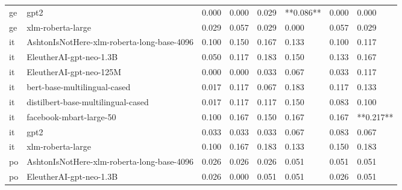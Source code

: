 \begin{tabular}{llllllll}
      ge &                                       gpt2 & 0.000 &                     0.000 &                 0.029 &              **0.086** &                                   0.000 &     0.000 \\
      ge &                          xlm-roberta-large & 0.029 &                     0.057 &                 0.029 &                  0.000 &                                   0.057 &     0.029 \\
      it & AshtonIsNotHere-xlm-roberta-long-base-4096 & 0.100 &                     0.150 &                 0.167 &                  0.133 &                                   0.100 &     0.117 \\
      it &                    EleutherAI-gpt-neo-1.3B & 0.050 &                     0.117 &                 0.183 &                  0.150 &                                   0.133 &     0.167 \\
      it &                    EleutherAI-gpt-neo-125M & 0.000 &                     0.000 &                 0.033 &                  0.067 &                                   0.033 &     0.117 \\
      it &               bert-base-multilingual-cased & 0.017 &                     0.117 &                 0.067 &                  0.183 &                                   0.117 &     0.133 \\
      it &         distilbert-base-multilingual-cased & 0.017 &                     0.117 &                 0.117 &                  0.150 &                                   0.083 &     0.100 \\
      it &                    facebook-mbart-large-50 & 0.100 &                     0.167 &                 0.150 &                  0.167 &                                   0.167 & **0.217** \\
      it &                                       gpt2 & 0.033 &                     0.033 &                 0.033 &                  0.067 &                                   0.083 &     0.067 \\
      it &                          xlm-roberta-large & 0.100 &                     0.167 &                 0.183 &                  0.133 &                                   0.150 &     0.183 \\
      po & AshtonIsNotHere-xlm-roberta-long-base-4096 & 0.026 &                     0.026 &                 0.026 &                  0.051 &                                   0.051 &     0.051 \\
      po &                    EleutherAI-gpt-neo-1.3B & 0.026 &                     0.000 &                 0.051 &                  0.051 &                                   0.026 &     0.051 \\

\end{tabular}
